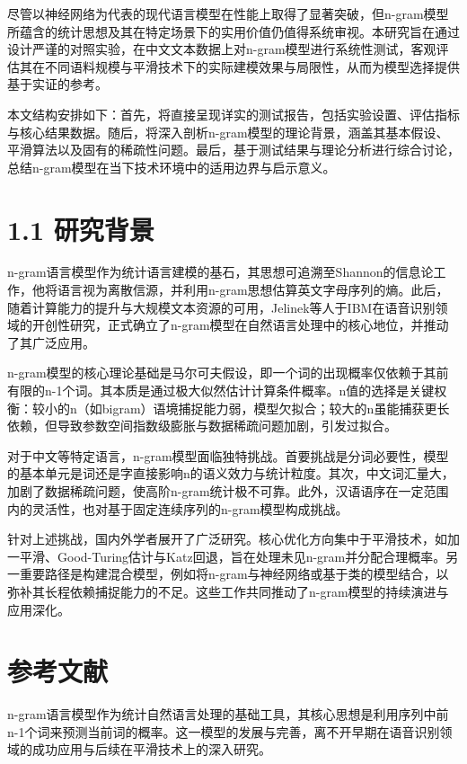 \documentclass[10pt,letterpaper,conference]{IEEEtran}
\begin{document}
尽管以神经网络为代表的现代语言模型在性能上取得了显著突破，但n-gram模型所蕴含的统计思想及其在特定场景下的实用价值仍值得系统审视。本研究旨在通过设计严谨的对照实验，在中文文本数据上对n-gram模型进行系统性测试，客观评估其在不同语料规模与平滑技术下的实际建模效果与局限性，从而为模型选择提供基于实证的参考。

本文结构安排如下：首先，将直接呈现详实的测试报告，包括实验设置、评估指标与核心结果数据。随后，将深入剖析n-gram模型的理论背景，涵盖其基本假设、平滑算法以及固有的稀疏性问题。最后，基于测试结果与理论分析进行综合讨论，总结n-gram模型在当下技术环境中的适用边界与启示意义。


\section{ 1.1 研究背景 }
n-gram语言模型作为统计语言建模的基石，其思想可追溯至Shannon的信息论工作，他将语言视为离散信源，并利用n-gram思想估算英文字母序列的熵\cite{anonndshannon1948}。此后，随着计算能力的提升与大规模文本资源的可用，Jelinek等人于IBM在语音识别领域的开创性研究，正式确立了n-gram模型在自然语言处理中的核心地位，并推动了其广泛应用\cite{anonndjelinek1980}。

n-gram模型的核心理论基础是马尔可夫假设，即一个词的出现概率仅依赖于其前有限的n-1个词。其本质是通过极大似然估计计算条件概率。n值的选择是关键权衡：较小的n（如bigram）语境捕捉能力弱，模型欠拟合；较大的n虽能捕获更长依赖，但导致参数空间指数级膨胀与数据稀疏问题加剧，引发过拟合。

对于中文等特定语言，n-gram模型面临独特挑战。首要挑战是分词必要性，模型的基本单元是词还是字直接影响n的语义效力与统计粒度。其次，中文词汇量大，加剧了数据稀疏问题，使高阶n-gram统计极不可靠。此外，汉语语序在一定范围内的灵活性，也对基于固定连续序列的n-gram模型构成挑战。

针对上述挑战，国内外学者展开了广泛研究。核心优化方向集中于平滑技术，如加一平滑、Good-Turing估计与Katz回退\cite{anonndchen1996}，旨在处理未见n-gram并分配合理概率。另一重要路径是构建混合模型，例如将n-gram与神经网络或基于类的模型结合，以弥补其长程依赖捕捉能力的不足。这些工作共同推动了n-gram模型的持续演进与应用深化。


\section{ 参考文献 }
n-gram语言模型作为统计自然语言处理的基础工具，其核心思想是利用序列中前n-1个词来预测当前词的概率。这一模型的发展与完善，离不开早期在语音识别领域的成功应用与后续在平滑技术上的深入研究。
\end{document}
